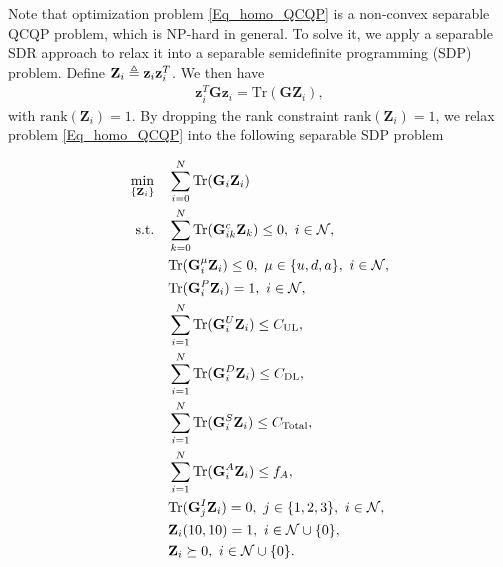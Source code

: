 \documentclass[10pt,journal,compsoc]{IEEEtran}
\def\zbf{{\bf z}}
\begin{document}
Note that optimization problem \eqref{Eq_homo_QCQP} is a non-convex
separable QCQP problem, which is NP-hard in general. To solve it, we
apply a separable SDR approach to relax it into a separable
semidefinite programming (SDP) problem. Define
$\mathbf{Z}_i\triangleq\zbf_i\zbf_i^T$. We then have
\begin{align}\label{z_to_Z}
\mathbf{z}_i^T\mathbf{G}\mathbf{z}_i =
\textrm{Tr}(\mathbf{G}\mathbf{Z}_i),
\end{align}
with $\textrm{rank}(\mathbf{Z}_i)=1$. By dropping the rank
constraint $\textrm{rank}(\mathbf{Z}_i)=1$, we relax problem
\eqref{Eq_homo_QCQP} into the following separable SDP problem
{\allowdisplaybreaks
\begin{align}
\min\limits_{\{\mathbf{Z}_i\}}
&\quad \sum_{i=0}^N\textrm{Tr}(\mathbf{G}_i\mathbf{Z}_i)\label{Eq_SDP_QCQP}\allowdisplaybreaks\\
\text{s.t.}
&\quad \sum_{k=0}^N\textrm{Tr}(\mathbf{G}^c_{ik}\mathbf{Z}_k)\leq 0,\ i \in\mathcal{N},\label{Eq_SDP_QCQP.a}\allowdisplaybreaks\\
&\quad \textrm{Tr}(\mathbf{G}^\mu_{i}\mathbf{Z}_i)\leq 0,\ \mu\in\{u,d,a\},\ i \in\mathcal{N},\label{Eq_SDP_QCQP.b}\allowdisplaybreaks\\
&\quad \textrm{Tr}(\mathbf{G}^P_i\mathbf{Z}_i)=1,\ i \in\mathcal{N},\label{Eq_SDP_QCQP.c}\allowdisplaybreaks\\
&\quad \sum_{i=1}^N\textrm{Tr}(\mathbf{G}^{U}_i\mathbf{Z}_i)\leq C_{\mathrm{UL}},\label{Eq_SDP_QCQP.d}\allowdisplaybreaks\\
&\quad \sum_{i=1}^N\textrm{Tr}(\mathbf{G}^{D}_i\mathbf{Z}_i)\leq C_{\mathrm{DL}},\label{Eq_SDP_QCQP.e}\allowdisplaybreaks\\
&\quad \sum_{i=1}^N\textrm{Tr}(\mathbf{G}^{S}_i\mathbf{Z}_i)\leq C_{\mathrm{Total}},\label{Eq_SDP_QCQP.total}\allowdisplaybreaks\\
&\quad \sum_{i=1}^N\textrm{Tr}(\mathbf{G}^{A}_i\mathbf{Z}_i)\leq f_A,\label{Eq_SDP_QCQP.f}\allowdisplaybreaks\\
&\quad \textrm{Tr}(\mathbf{G}^I_j\mathbf{Z}_i)=0,\ j \in\{ 1,2,3\},\ i \in\mathcal{N},\label{Eq_SDP_QCQP.g}\allowdisplaybreaks\\
&\quad \mathbf{Z}_i(10,10)=1,\ i \in\mathcal{N}\cup\{0\},
\label{Eq_SDP_QCQP.h}\\
&\quad \mathbf{Z}_i\succeq 0,\ i \in\mathcal{N}\cup\{0\}.
\label{Eq_SDP_QCQP.i}
\end{align}

}
\end{document}
